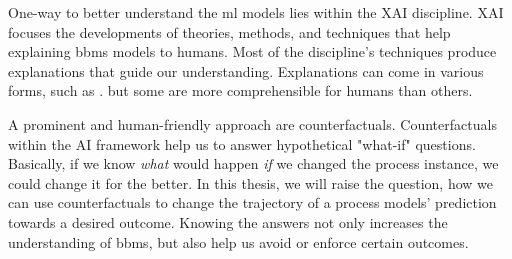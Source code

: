\documentclass[./../../paper.tex]{subfiles}
\begin{document}

One-way to better understand the \gls{ml} models lies within the \gls{XAI} discipline. XAI focuses the developments of theories, methods, and techniques that help explaining \glspl{bbm} models to humans. Most of the discipline's techniques produce explanations that guide our understanding. Explanations can come in various forms, such as \needscite{}. but some are more comprehensible for humans than others. 

A prominent and human-friendly approach are counterfactuals\needscite{}. Counterfactuals within the AI framework help us to answer hypothetical "what-if" questions. Basically, if we know \emph{what} would happen \emph{if} we changed the process instance, we could change it for the better. In this thesis, we will raise the question, how we can use counterfactuals to change the trajectory of a process models' prediction towards a desired outcome. Knowing the answers not only increases the understanding of \glspl{bbm}, but also help us avoid or enforce certain outcomes. 
\end{document}
